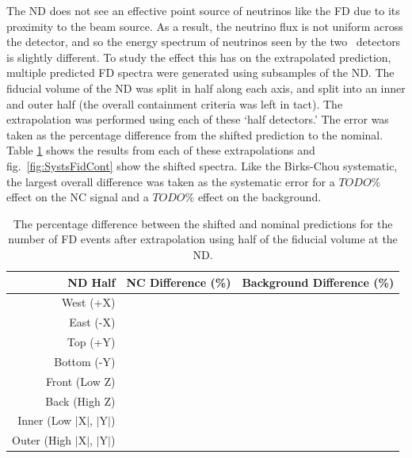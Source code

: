 The ND does not see an effective point source of neutrinos like the FD due to its proximity to the beam source. As a result, the neutrino flux is not uniform across the detector, and so the energy spectrum of neutrinos seen by the two \nova~detectors is slightly different. To study the effect this has on the extrapolated prediction, multiple predicted FD spectra were generated using subsamples of the ND. The fiducial volume of the ND was split in half along each axis, and split into an inner and outer half (the overall containment criteria was left in tact). The extrapolation was performed using each of these `half detectors.' The error was taken as the percentage difference from the shifted prediction to the nominal. Table \ref{tab:SystFidCont} shows the results from each of these extrapolations and fig.~\ref{fig:SystsFidCont} show the shifted spectra. Like the Birks-Chou systematic, the largest overall difference was taken as the systematic error for a $TODO\%$ effect on the NC signal and a $TODO\%$ effect on the background.
\begin{table}[h]
  \begin{center}
    \caption[ND Containment Systematic Errors]{The percentage difference between the shifted and nominal predictions for the number of FD events after extrapolation using half of the fiducial volume at the ND.}
    \label{tab:SystFidCont}
    \begin{tabular}{r c c}
      \hline\hline
      ND Half & NC Difference (\%) & Background Difference (\%) \\
      \hline
      West (+X) & & \\
      East (-X) & & \\
      Top (+Y) & & \\
      Bottom (-Y) & & \\
      Front (Low Z) & & \\
      Back (High Z) & & \\
      Inner (Low $\vert$X$\vert$, $\vert$Y$\vert$) & & \\
      Outer (High $\vert$X$\vert$, $\vert$Y$\vert$) & & \\
      \hline
    \end{tabular}
  \end{center}
\end{table}

